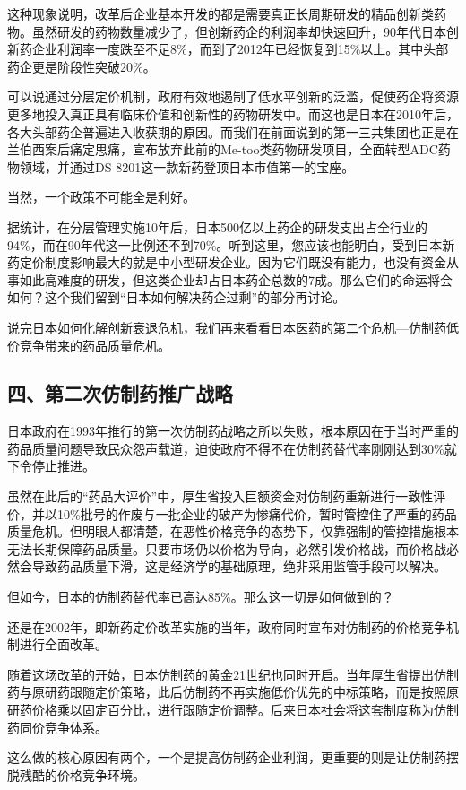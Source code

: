 这种现象说明，改革后企业基本开发的都是需要真正长周期研发的精品创新类药物。虽然研发的药物数量减少了，但创新药企的利润率却快速回升，90年代日本创新药企业利润率一度跌至不足8\%，而到了2012年已经恢复到15\%以上。其中头部药企更是阶段性突破20\%。

可以说通过分层定价机制，政府有效地遏制了低水平创新的泛滥，促使药企将资源更多地投入真正具有临床价值和创新性的药物研发中。而这也是日本在2010年后，各大头部药企普遍进入收获期的原因。而我们在前面说到的第一三共集团也正是在兰伯西案后痛定思痛，宣布放弃此前的Me-too类药物研发项目，全面转型ADC药物领域，并通过DS-8201这一款新药登顶日本市值第一的宝座。

当然，一个政策不可能全是利好。

据统计，在分层管理实施10年后，日本500亿以上药企的研发支出占全行业的94\%，而在90年代这一比例还不到70\%。听到这里，您应该也能明白，受到日本新药定价制度影响最大的就是中小型研发企业。因为它们既没有能力，也没有资金从事如此高难度的研发，但这类企业却占日本药企总数的7成。那么它们的命运将会如何？这个我们留到“日本如何解决药企过剩”的部分再讨论。

说完日本如何化解创新衰退危机，我们再来看看日本医药的第二个危机—仿制药低价竞争带来的药品质量危机。

\subsection{四、第二次仿制药推广战略}

日本政府在1993年推行的第一次仿制药战略之所以失败，根本原因在于当时严重的药品质量问题导致民众怨声载道，迫使政府不得不在仿制药替代率刚刚达到30\%就下令停止推进。

虽然在此后的“药品大评价”中，厚生省投入巨额资金对仿制药重新进行一致性评价，并以10\%批号的作废与一批企业的破产为惨痛代价，暂时管控住了严重的药品质量危机。但明眼人都清楚，在恶性价格竞争的态势下，仅靠强制的管控措施根本无法长期保障药品质量。只要市场仍以价格为导向，必然引发价格战，而价格战必然会导致药品质量下滑，这是经济学的基础原理，绝非采用监管手段可以解决。

但如今，日本的仿制药替代率已高达85\%。那么这一切是如何做到的？

还是在2002年，即新药定价改革实施的当年，政府同时宣布对仿制药的价格竞争机制进行全面改革。

随着这场改革的开始，日本仿制药的黄金21世纪也同时开启。当年厚生省提出仿制药与原研药跟随定价策略，此后仿制药不再实施低价优先的中标策略，而是按照原研药价格乘以固定百分比，进行跟随定价调整。后来日本社会将这套制度称为仿制药同价竞争体系。

这么做的核心原因有两个，一个是提高仿制药企业利润，更重要的则是让仿制药摆脱残酷的价格竞争环境。


